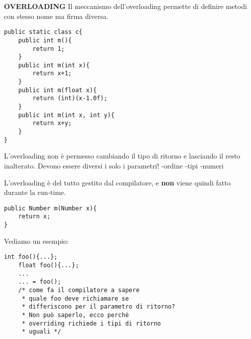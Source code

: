 \noindent \textbf{OVERLOADING} \newline
Il meccanismo dell'overloading permette di definire metodi con stesso nome ma firma diversa. 

\begin{lstlisting}[basicstyle=\small,]
public static class c{
	public int m(){
		return 1;
	}
	public int m(int x){
		return x+1;
	}
	public int m(float x){
		return (int)(x-1.0f);
	}
	public int m(int x, int y){
		return x+y;
	}		
}
\end{lstlisting}

\noindent L'overloading non è permesso cambiando il tipo di ritorno e lasciando il resto inalterato. Devono essere diversi i solo i parametri! \newline
-ordine \newline
-tipi \newline
-numeri \newline

\noindent L'overloading è del tutto gestito dal compilatore, e \textbf{non} viene quindi fatto durante la run-time.

\begin{lstlisting}[basicstyle=\small,]
public Number m(Number x){
	return x;
}
\end{lstlisting}
Vediamo un esempio:
\begin{lstlisting}[basicstyle=\small,]
	int foo(){...};
	float foo(){...};
	...
	... = foo();
	/* come fa il compilatore a sapere
	 * quale foo deve richiamare se 
	 * differiscono per il parametro di ritorno? 
	 * Non può saperlo, ecco perchè 
	 * overriding richiede i tipi di ritorno
	 * uguali */
\end{lstlisting}
























